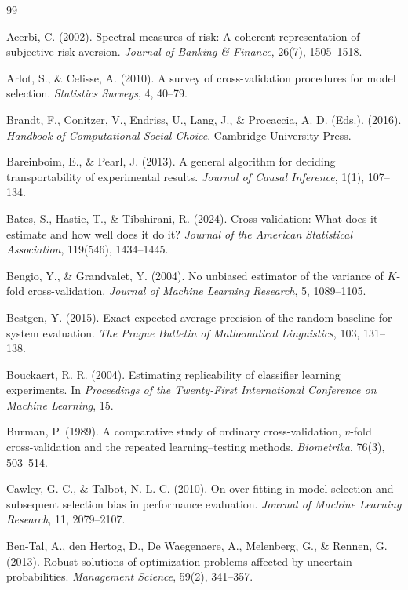 \documentclass[11pt]{article}
\theoremstyle{remark}
\begin{document}
\clearpage
\begin{thebibliography}{99}
\setlength{\itemsep}{0.25em}

Acerbi, C. (2002).
Spectral measures of risk: A coherent representation of subjective risk aversion.
\emph{Journal of Banking \& Finance}, 26(7), 1505--1518.

Arlot, S., \& Celisse, A. (2010).
A survey of cross-validation procedures for model selection.
\emph{Statistics Surveys}, 4, 40--79.

Brandt, F., Conitzer, V., Endriss, U., Lang, J., \& Procaccia, A. D. (Eds.). (2016).
\emph{Handbook of Computational Social Choice}.
Cambridge University Press.

Bareinboim, E., \& Pearl, J. (2013).
A general algorithm for deciding transportability of experimental results.
\emph{Journal of Causal Inference}, 1(1), 107--134.

Bates, S., Hastie, T., \& Tibshirani, R. (2024).
Cross-validation: What does it estimate and how well does it do it?
\emph{Journal of the American Statistical Association}, 119(546), 1434--1445.

Bengio, Y., \& Grandvalet, Y. (2004).
No unbiased estimator of the variance of $K$-fold cross-validation.
\emph{Journal of Machine Learning Research}, 5, 1089--1105.

Bestgen, Y. (2015).
Exact expected average precision of the random baseline for system evaluation.
\emph{The Prague Bulletin of Mathematical Linguistics}, 103, 131--138.

Bouckaert, R. R. (2004).
Estimating replicability of classifier learning experiments.
In \emph{Proceedings of the Twenty-First International Conference on Machine Learning}, 15.

Burman, P. (1989).
A comparative study of ordinary cross-validation, $v$-fold cross-validation
and the repeated learning--testing methods.
\emph{Biometrika}, 76(3), 503--514.

Cawley, G. C., \& Talbot, N. L. C. (2010).
On over-fitting in model selection and subsequent selection bias in performance
evaluation.
\emph{Journal of Machine Learning Research}, 11, 2079--2107.

Ben-Tal, A., den Hertog, D., De Waegenaere, A., Melenberg, G., \& Rennen, G. (2013).
Robust solutions of optimization problems affected by uncertain probabilities.
\emph{Management Science}, 59(2), 341--357.


\end{thebibliography}
\end{document}

